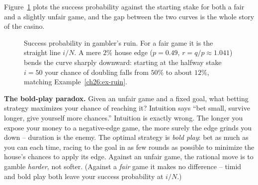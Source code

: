 Figure~\ref{ch26:fig-ruin} plots the success probability against the starting
stake for both a fair and a slightly unfair game, and the gap between the two
curves is the whole story of the casino.

\begin{figure}[H]
\centering
{}
\caption{Success probability in gambler's ruin. For a fair game it is the
straight line $i/N$. A mere $2\%$ house edge ($p=0.49$, $r=q/p\approx1.041$)
bends the curve sharply downward: starting at the halfway stake $i=50$ your
chance of doubling falls from $50\%$ to about $12\%$, matching
Example~\ref{ch26:ex-ruin}.}
\label{ch26:fig-ruin}
\end{figure}

\begin{paradoxbox}
\textbf{The bold-play paradox.} Given an unfair game and a fixed goal, what
betting strategy maximizes your chance of reaching it? Intuition says ``bet
small, survive longer, give yourself more chances.'' Intuition is exactly
wrong. The longer you expose your money to a negative-edge game, the more
surely the edge grinds you down -- duration is the enemy. The optimal strategy
is \emph{bold play}: bet as much as you can each time, racing to the goal in as
few rounds as possible to minimize the house's chances to apply its edge.
Against an unfair game, the rational move is to gamble \emph{harder}, not
softer. (Against a \emph{fair} game it makes no difference -- timid and bold play
both leave your success probability at $i/N$.)
\end{paradoxbox}

